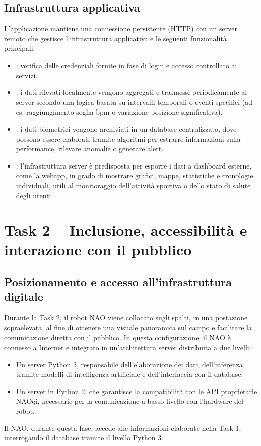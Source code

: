 \documentclass{optica-article}
\begin{document}
\subsection{Infrastruttura applicativa}
L'applicazione mantiene una connessione persistente (HTTP) con un server remoto che gestisce l'infrastruttura applicativa e le seguenti funzionalit\`a principali:
\begin{itemize}
    \item {}: verifica delle credenziali fornite in fase di login e accesso controllato ai servizi.
    \item {}: i dati rilevati localmente vengono aggregati e trasmessi periodicamente al server secondo una logica basata su intervalli temporali o eventi specifici (ad es. raggiungimento soglia bpm o variazione posizione significativa).
    \item {}: i dati biometrici vengono archiviati in un database centralizzato, dove possono essere elaborati tramite algoritmi per estrarre informazioni sulla performance, rilevare anomalie o generare alert.
    \item {}: l'infrastruttura server \`e predisposta per esporre i dati a dashboard esterne, come la webapp, in grado di mostrare grafici, mappe, statistiche e cronologie individuali, utili al monitoraggio dell'attivit\`a sportiva o dello stato di salute degli utenti.
\end{itemize}
\bigskip

\section{Task 2 -- Inclusione, accessibilit\`a e interazione con il pubblico}

\subsection{Posizionamento e accesso all'infrastruttura digitale}
Durante la Task 2, il robot NAO viene collocato sugli spalti, in una postazione sopraelevata, al fine di ottenere una visuale panoramica sul campo e facilitare la comunicazione diretta con il pubblico. In questa configurazione, il NAO \`e connesso a Internet e integrato in un'architettura server distribuita a due livelli:
\begin{itemize}
    \item Un server Python 3, responsabile dell'elaborazione dei dati, dell'inferenza tramite modelli di intelligenza artificiale e dell'interfaccia con il database.
    \item Un server in Python 2, che garantisce la compatibilit\`a con le API proprietarie NAOqi, necessarie per la comunicazione a basso livello con l'hardware del robot.
\end{itemize}
Il NAO, durante questa fase, accede alle informazioni elaborate nella Task 1, interrogando il database tramite il livello Python 3.
\end{document}

